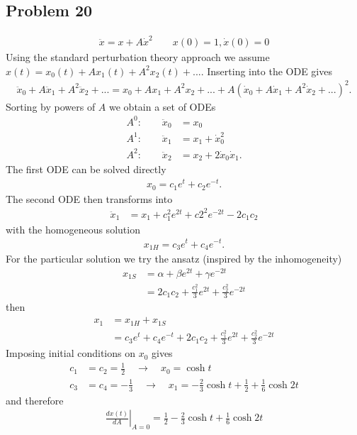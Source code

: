 \documentclass[10pt,a4paper]{book}
\theoremstyle{definition}
\begin{document}
\subsection{Problem 20}
\begin{align}
    \ddot{x}=x+A\dot{x}^2\quad\quad x(0)=1, \dot{x}(0)=0
\end{align}
Using the standard perturbation theory approach we assume $x(t)=x_0(t)+Ax_1(t)+A^2x_2(t)+...$. Inserting into the ODE gives 
\begin{align}
    \ddot{x}_0+A\ddot{x}_1+A^2\ddot{x}_2+...=x_0+Ax_1+A^2x_2+...+A\left(\dot{x}_0+A\dot{x}_1+A^2\dot{x}_2+...\right)^2.
\end{align}
Sorting by powers of $A$ we obtain a set of ODEs
\begin{align}
    A^0:\quad\quad\ddot{x}_0&=x_0\\
    A^1:\quad\quad\ddot{x}_1&=x_1+\dot{x}_0^2\\
    A^2:\quad\quad\ddot{x}_2&=x_2+2\dot{x}_0\dot{x}_1.
\end{align}
The first ODE can be solved directly
\begin{align}
    x_0=c_1e^t+c_2e^{-t}.
\end{align}
The second ODE then transforms into
\begin{align}
    \ddot{x}_1&=x_1+c_1^2e^{2t}+c2^2e^{-2t}-2c_1c_2
\end{align}
with the homogeneous solution
\begin{align}
    x_{1H}=c_3e^t+c_4e^{-t}.
\end{align}
For the particular solution we try the ansatz (inspired by the inhomogeneity) 
\begin{align}
    x_{1S}&=\alpha+\beta e^{2t}+\gamma e^{-2t}\\
    &=2c_1c_2+\frac{c_1^2}{3}e^{2t}+\frac{c_2^2}{3}e^{-2t}
\end{align}
then
\begin{align}
x_1&=x_{1H}+x_{1S}\\
&=c_3e^t+c_4e^{-t}+2c_1c_2+\frac{c_1^2}{3}e^{2t}+\frac{c_2^2}{3}e^{-2t}
\end{align}
Imposing initial conditions on $x_0$ gives
\begin{align}
    c_1&=c_2=\frac{1}{2}\quad\rightarrow\quad x_0=\cosh t\\
    c_3&=c_4=-\frac{1}{3}\quad\rightarrow\quad x_1=-\frac{2}{3}\cosh t+\frac{1}{2}+\frac{1}{6}\cosh 2t
\end{align}
and therefore
\begin{align}
    \left.\frac{dx(t)}{dA}\right|_{A=0}=\frac{1}{2}-\frac{2}{3}\cosh t+\frac{1}{6}\cosh 2t
\end{align}
\end{document}
